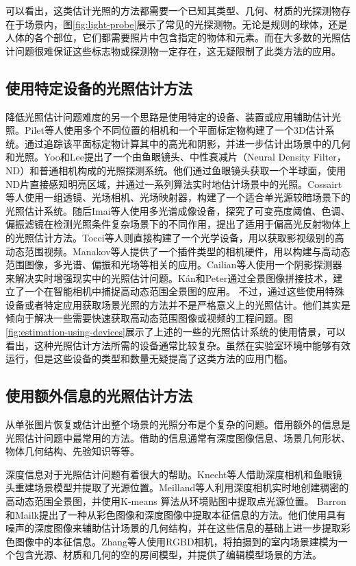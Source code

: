 可以看出，这类估计光照的方法都需要一个已知其类型、几何、材质的光探测物存在于场景内，图\ref{fig:light-probe}展示了常见的光探测物。无论是规则的球体，还是人体的各个部位，它们都需要照片中包含指定的物体和元素。而在大多数的光照估计问题很难保证这些标志物或探测物一定存在，这无疑限制了此类方法的应用。

\subsection{使用特定设备的光照估计方法}

降低光照估计问题难度的另一个思路是使用特定的设备、装置或应用辅助估计光照。Pilet等人\cite{pilet2006all}使用多个不同位置的相机和一个平面标定物构建了一个3D估计系统。通过追踪该平面标定物计算其中的高光和阴影，并进一步估计出场景中的几何和光照。Yoo和Lee\cite{yoo2008real}提出了一个由鱼眼镜头、中性衰减片（Neural Density Filter，ND）和普通相机构成的光照探测系统。他们通过鱼眼镜头获取一个半球面，使用ND片直接感知明亮区域，并通过一系列算法实时地估计场景中的光照。Cossairt等人\cite{cossairt2008light}使用一组透镜、光场相机、光场映射器，构建了一个适合单光源较暗场景下的光照估计系统。随后Imai等人\cite{imai2011estimation}使用多光谱成像设备，探究了可变亮度阈值、色调、偏振滤镜在检测光照条件复杂场景下的不同作用，提出了适用于偏高光反射物体上的光照估计方法。Tocci等人\cite{tocci2011versatile}则直接构建了一个光学设备，用以获取影视级别的高动态范围视频。Manakov等人\cite{manakov2013reconfigurable}提供了一个插件类型的相机硬件，用以构建与高动态范围图像，多光谱、偏振和光场等相关的应用。Cailian等人\cite{calian2013shading}使用一个阴影探测器来解决实时增强现实中的光照估计问题。K\'an和Peter\cite{kan2015interactive}通过全景图像拼接技术，建立了一个在智能相机中捕捉高动态范围全景图的应用。
不过，通过这些使用特殊设备或者特定应用获取场景光照的方法并不是严格意义上的光照估计。他们其实是倾向于解决一些需要快速获取高动态范围图像或视频的工程问题。图\ref{fig:estimation-using-devices}展示了上述的一些的光照估计系统的使用情景，可以看出，这种光照估计方法所需的设备通常比较复杂。虽然在实验室环境中能够有效运行，但是这些设备的类型和数量无疑提高了这类方法的应用门槛。

\subsection{使用额外信息的光照估计方法}
从单张图片恢复或估计出整个场景的光照分布是个复杂的问题。借用额外的信息是光照估计问题中最常用的方法。借助的信息通常有深度图像信息、场景几何形状、物体几何结构、先验知识等等。

深度信息对于光照估计问题有着很大的帮助。Knecht等人\cite{knecht2012reciprocal}借助深度相机和鱼眼镜头重建场景模型并提取了光源位置。Meilland等人\cite{meilland20133d}利用深度相机实时地创建稠密的高动态范围全景图，并使用K-means 算法从环境贴图中提取点光源位置。 Barron和Mailk\cite{barron2013intrinsic}提出了一种从彩色图像和深度图像中提取本征信息的方法。他们使用具有噪声的深度图像来辅助估计场景的几何结构，并在这些信息的基础上进一步提取彩色图像中的本征信息。Zhang等人\cite{zhang2016emptying}使用RGBD相机，将拍摄到的室内场景建模为一个包含光源、材质和几何的空的房间模型，并提供了编辑模型场景的方法。


